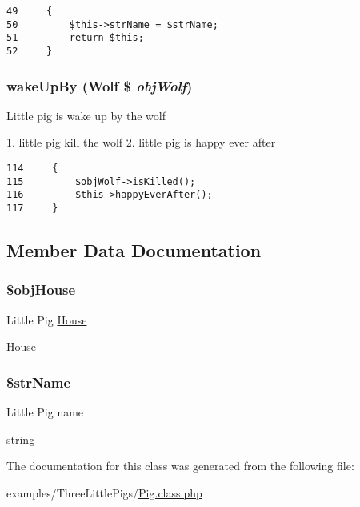 \begin{Code}\begin{verbatim}49     {
50         $this->strName = $strName;
51         return $this;
52     }
\end{verbatim}
\end{Code}


\hypertarget{class_little_pig_ec9bcb744b45ac0a7b30e9e53bddb4d4}{
\subsubsection[{wakeUpBy}]{\setlength{\rightskip}{0pt plus 5cm}wakeUpBy ({\bf Wolf} \$ {\em objWolf})}}
\label{class_little_pig_ec9bcb744b45ac0a7b30e9e53bddb4d4}


Little pig is wake up by the wolf

1. little pig kill the wolf 2. little pig is happy ever after 

\begin{Code}\begin{verbatim}114     {
115         $objWolf->isKilled();
116         $this->happyEverAfter();
117     }
\end{verbatim}
\end{Code}




\subsection{Member Data Documentation}
\hypertarget{class_little_pig_79150187cd5131ac2aa384dc660f3f65}{
\subsubsection[{\$objHouse}]{\setlength{\rightskip}{0pt plus 5cm}\$objHouse}}
\label{class_little_pig_79150187cd5131ac2aa384dc660f3f65}


Little Pig \hyperlink{class_house}{House}

\hyperlink{class_house}{House} \hypertarget{class_little_pig_90edf7538a74be8ac5ce46baaf203382}{
\subsubsection[{\$strName}]{\setlength{\rightskip}{0pt plus 5cm}\$strName}}
\label{class_little_pig_90edf7538a74be8ac5ce46baaf203382}


Little Pig name

string 

The documentation for this class was generated from the following file:\begin{CompactItemize}
\item 
examples/ThreeLittlePigs/\hyperlink{_pig_8class_8php}{Pig.class.php}\end{CompactItemize}
